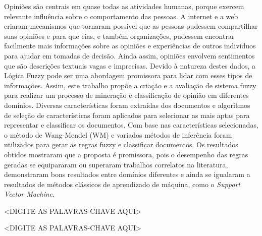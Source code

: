 \documentclass[msc, a4paper, classic, pt]{ufbathesis}
\begin{document}
\resumo
Opiniões são centrais em quase todas as atividades humanas, porque exercem relevante influência sobre o comportamento das pessoas. A internet e a web criaram mecanismos que tornaram possível que as pessoas pudessem compartilhar suas opiniões e para que eias, e também organizações, pudessem encontrar facilmente mais informações sobre as opiniões e experiências de outros indivíduos para ajudar em tomadas de decisão. Ainda assim, opiniões envolvem sentimentos que são descrições textuais vagas e imprecisas. Devido à natureza destes dados, a Lógica Fuzzy pode ser uma abordagem promissora para lidar com esses tipos de informações. Assim, este trabalho propõe a criação e a avaliação de sistema fuzzy para realizar um processo de mineração e classificação de opinião em diferentes domínios. Diversas características foram extraídas dos documentos e algoritmos de seleção de características foram aplicados para selecionar as mais aptas para representar e classificar os documentos. Com base nas características selecionadas, o método de Wang-Mendel (WM) e variados métodos de inferência foram utilizados para gerar as regras fuzzy e classificar documentos. Os resultados obtidos mostraram que a proposta é promissora, pois o desempenho das regras geradas se equipararam ou superaram trabalhos correlatos na literatura, demonstraram bons resultados entre domínios diferentes e ainda se igualaram a resultados de métodos clássicos de aprendizado de máquina, como o \textit{Support Vector Machine}.
\begin{keywords}
<DIGITE AS PALAVRAS-CHAVE AQUI>
\end{keywords}

\abstract
\begin{keywords}
<DIGITE AS PALAVRAS-CHAVE AQUI>
\end{keywords}

\tableofcontents

\listoffigures

\listoftables

\mainmatter

% 
% 
% 
%
\end{document}
